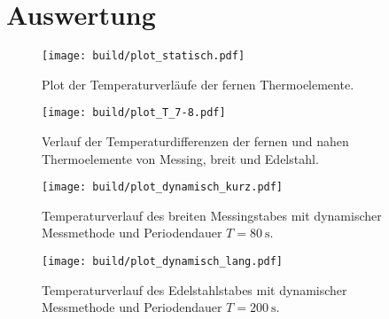 \section{Auswertung}
\label{sec:Auswertung}

\begin{figure}
  \centering
  \texttt{[image: build/plot\_statisch.pdf]}
  \caption{Plot der Temperaturverläufe der fernen Thermoelemente.}
  \label{fig:temperaturverlauf statisch, fern}
\end{figure}

\begin{figure}
  \centering
  \texttt{[image: build/plot\_T\_7-8.pdf]}
  \caption{Verlauf der Temperaturdifferenzen der fernen und nahen %
  Thermoelemente von Messing, breit und Edelstahl.}
  \label{fig:temperaturdifferenzen, messing, edelstahl}
\end{figure}

\begin{figure}
  \centering
  \texttt{[image: build/plot\_dynamisch\_kurz.pdf]}
  \caption{Temperaturverlauf des breiten Messingstabes mit dynamischer Messmethode und %
  Periodendauer $T=\qty{80}{\second}$.}
  \label{fig:temperaturdifferenzen kurz, messing, edelstahl}
\end{figure}

\begin{figure}
  \centering
  \texttt{[image: build/plot\_dynamisch\_lang.pdf]} 
  \caption{Temperaturverlauf des Edelstahlstabes mit dynamischer Messmethode und %
  Periodendauer $T=\qty{200}{\second}$.}
  \label{fig:temperaturdifferenzen lang, messing, edelstahl}
\end{figure}